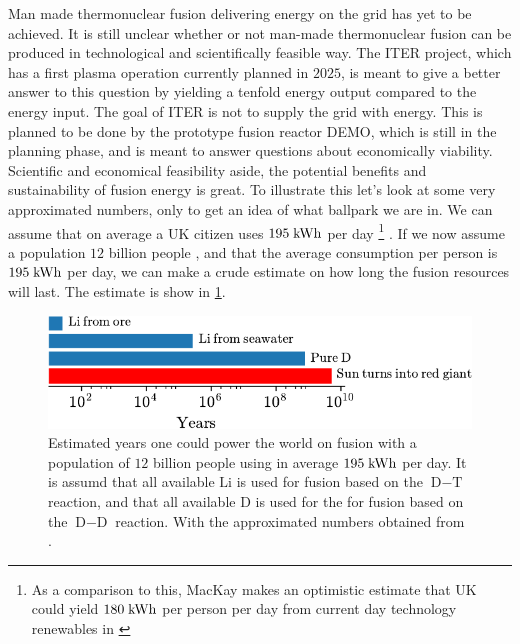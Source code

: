 Man made thermonuclear fusion delivering energy on the grid has yet to be achieved.
It is still unclear whether or not man-made thermonuclear fusion can be produced in technological and scientifically feasible way.
The ITER \cite{ITERWeb} project, which has a first plasma operation currently planned in $2025$, is meant to give a better answer to this question by yielding a tenfold energy output compared to the energy input.
The goal of ITER is not to supply the grid with energy.
This is planned to be done by the prototype fusion reactor DEMO, which is still in the planning phase, and is meant to answer questions about economically viability.
Scientific and economical feasibility aside, the potential benefits and sustainability of fusion energy is great.
To illustrate this let's look at some very approximated numbers, only to get an idea of what ballpark we are in.
We can assume that on average a UK citizen uses $195 \text{\;kWh}$ per day%
\footnote{As a comparison to this, MacKay makes an optimistic estimate that UK could yield $180 \text{\;kWh}$ per person per day from current day technology renewables in \cite{Mackay2009book}}%
%
\cite{Mackay2009book}.
If we now assume a population $12$ billion people \cite{Melorose2015}, and that the average consumption per person is $195 \text{\;kWh}$ per day, we can make a crude estimate on how long the fusion resources will last.
The estimate is show in \cref{fig:potFusion}.
%
\begin{figure}[htb]
    \begin{center}
        \includegraphics{fig/intro/fusionSustain}
    \end{center}
    \caption{Estimated years one could power the world on fusion with a population of $12$ billion people using in average $195 \text{\;kWh}$ per day.
        It is assumd that all available $\text{Li}$ is used for fusion based on the $\text{D}-\text{T}$ reaction, and that all available $\text{D}$ is used for the for fusion based on the $\text{D}-\text{D}$ reaction.
        With the approximated numbers obtained from \cite{Melorose2015,Mackay2009book,ongena2012,Eckhartt1995}.}
    \label{fig:potFusion}
\end{figure}

